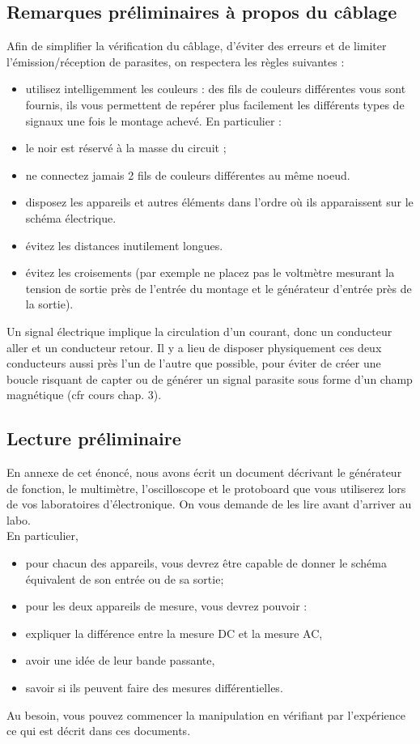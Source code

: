 \documentclass{../template/tp}
\begin{document}
\subsection{Remarques préliminaires à propos du câblage}
Afin de simplifier la vérification du câblage, d'éviter des erreurs et de limiter l'émission/réception de parasites, on
respectera les règles suivantes :
\begin{itemize}
\item utilisez intelligemment les couleurs : des fils de couleurs différentes vous sont fournis, ils vous permettent de
repérer plus facilement les différents types de signaux une fois le montage achevé. En particulier :
\item le noir est réservé à la masse du circuit ;
\item ne connectez jamais 2 fils de couleurs différentes au même noeud.
\item disposez les appareils et autres éléments dans l'ordre où ils apparaissent sur le schéma électrique.
\item évitez les distances inutilement longues.
\item évitez les croisements (par exemple ne placez pas le voltmètre mesurant la tension de sortie près de l'entrée du
montage et le générateur d'entrée près de la sortie).
\end{itemize}
Un signal électrique implique la circulation d'un courant, donc un conducteur aller et un conducteur retour. Il y a lieu
de disposer physiquement ces deux conducteurs aussi près l'un de l'autre que possible, pour éviter de créer une boucle
risquant de capter ou de générer un signal parasite sous forme d'un champ magnétique (cfr cours chap. 3).

\subsection{Lecture préliminaire}

En annexe de cet énoncé, nous avons écrit un document décrivant le générateur de fonction, le multimètre,
l'oscilloscope et le protoboard que vous utiliserez lors de vos laboratoires d'électronique.
On vous demande de les lire avant d'arriver au labo.\\
En particulier,
\begin{itemize}
\item pour chacun des appareils, vous devrez être capable de donner le schéma équivalent de son entrée ou de sa
sortie;
\item pour les deux appareils de mesure, vous devrez pouvoir :
\item expliquer la différence entre la mesure DC et la mesure AC,
\item avoir une idée de leur bande passante,
\item savoir si ils peuvent faire des mesures différentielles.
\end{itemize}
Au besoin, vous pouvez commencer la manipulation en vérifiant par l'expérience ce qui est décrit dans ces
documents.
\end{document}
